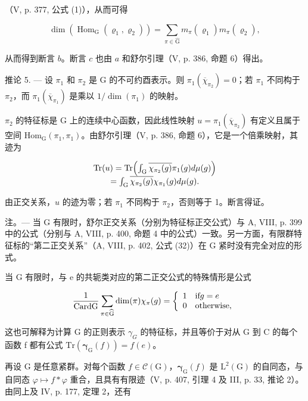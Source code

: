 （V, p. 377, 公式 (1)），从而可得

\[
\dim (\operatorname{Hom} _ {\mathrm{G}} (\varrho_ {1}, \varrho_ {2})) = \sum_ {\pi \in \widehat {\mathrm{G}}} m _ {\pi} (\varrho_ {1}) m _ {\pi} (\varrho_ {2}),
\]

从而得到断言 \(b\)。断言 \(c\) 也由 \(a\) 和舒尔引理（V, p. 386, 命题 6）得出。

推论 5. --- 设 \(\pi_1\) 和 \(\pi_2\) 是 G 的不可约酉表示。则 \(\pi_1(\overline{\chi}_{\pi_2}) = 0\)；若 \(\pi_1\) 不同构于 \(\pi_2\)，而 \(\pi_1(\overline{\chi}_{\pi_1})\) 是乘以 \(1/\dim(\pi_1)\) 的映射。

\(\pi_2\) 的特征标是 G 上的连续中心函数，因此线性映射 \(u = \pi_1(\overline{\chi}_{\pi_2})\) 有定义且属于空间 \(\mathrm{Hom}_{\mathrm{G}}(\pi_1,\pi_1)\)。由舒尔引理（V, p. 386, 命题 6），它是一个倍乘映射，其迹为

\[
\begin{array}{c} \operatorname{Tr} (u) = \operatorname{Tr} \Bigl (\int_ {\mathrm{G}} \overline {{\chi_ {\pi_ {2}} (g)}}   \pi_ {1} (g) d \mu (g) \Bigr) \\ = \int_ {\mathrm{G}} \overline {{\chi_ {\pi_ {2}} (g)}} \chi_ {\pi_ {1}} (g) d \mu (g). \end{array}
\]

由正交关系，\(u\) 的迹为零；若 \(\pi_1\) 不同构于 \(\pi_2\)，否则等于 1。断言得证。

注。--- 当 G 有限时，舒尔正交关系（分别为特征标正交公式）与 A, VIII, p. 399 中的公式（分别与 A, VIII, p. 400, 命题 4 中的公式）一致。另一方面，有限群特征标的“第二正交关系”（A, VIII, p. 402, 公式 (32)）在 G 紧时没有完全对应的形式。

当 G 有限时，与 e 的共轭类对应的第二正交公式的特殊情形是公式

\[
\frac {1}{\mathrm{CardG}} \sum_ {\pi \in \widehat {\mathrm{G}}} \dim (\pi) \chi _ {\pi} (g) = \left\{ \begin{array}{l l} 1 & \text {if} g = e \\ 0 & \text {otherwise}, \end{array} \right.
\]

这也可解释为计算 G 的正则表示 \(\gamma_{G}\) 的特征标，并且等价于对从 G 到 C 的每个函数 f 都有公式 \(\mathrm{Tr}(\boldsymbol{\gamma}_{\mathrm{G}}(f)) = f(e)\)。

再设 G 是任意紧群。对每个函数 \(f \in \mathcal{C}(\mathrm{G})\)，\(\boldsymbol{\gamma}_{\mathrm{G}}(f)\) 是 \(\mathrm{L}^{2}(\mathrm{G})\) 的自同态，与自同态 \(\varphi \mapsto f * \varphi\) 重合，且具有有限迹（V, p. 407, 引理 4 及 III, p. 33, 推论 2）。由同上及 IV, p. 177, 定理 2，还有

